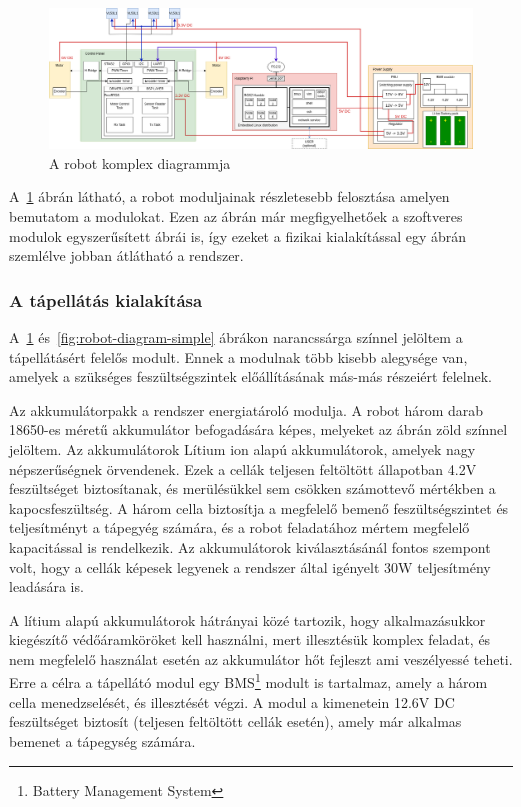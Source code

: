 \begin{figure}
  \centering
  \includegraphics[width=150mm, keepaspectratio]{figures/ch2/robot-diagram-complex.png}
  \caption{A robot komplex diagrammja}
  \label{fig:robot-diagram-complex}
\end{figure}

\medskip

A~\ref{fig:robot-diagram-complex} ábrán látható, a robot moduljainak részletesebb
felosztása amelyen bemutatom a modulokat. Ezen az ábrán már megfigyelhetőek a
szoftveres modulok egyszerűsített ábrái is, így ezeket a fizikai kialakítással
egy ábrán szemlélve jobban átlátható a rendszer.

\subsubsection{A tápellátás kialakítása}
A~\ref{fig:robot-diagram-complex} és~\ref{fig:robot-diagram-simple} ábrákon
narancssárga színnel jelöltem a tápellátásért felelős modult. Ennek a modulnak
több kisebb alegysége van, amelyek a szükséges feszültségszintek előállításának
más-más részeiért felelnek.

\medskip

Az akkumulátorpakk a rendszer energiatároló modulja. A robot három darab 18650-es
méretű akkumulátor befogadására képes, melyeket az ábrán zöld színnel
jelöltem. Az akkumulátorok Lítium ion alapú akkumulátorok, amelyek nagy
népszerűségnek örvendenek. Ezek a cellák teljesen feltöltött állapotban 4.2V
feszültséget biztosítanak, és merülésükkel sem csökken számottevő mértékben a
kapocsfeszültség. A három cella biztosítja a megfelelő bemenő feszültségszintet
és teljesítményt a tápegyég számára, és a robot feladatához mértem megfelelő
kapacitással is rendelkezik. Az akkumulátorok kiválasztásánál fontos szempont
volt, hogy a cellák képesek legyenek a rendszer által igényelt 30W teljesítmény
leadására is.

\medskip

A lítium alapú akkumulátorok hátrányai közé tartozik, hogy alkalmazásukkor
kiegészítő védőáramköröket kell használni, mert illesztésük komplex feladat, és
nem megfelelő használat esetén az akkumulátor hőt fejleszt ami veszélyessé
teheti. Erre a célra a tápellátó modul egy BMS\footnote{Battery Management
System} modult is tartalmaz, amely a három cella menedzselését, és illesztését
végzi. A modul a kimenetein 12.6V DC feszültséget biztosít (teljesen feltöltött
cellák esetén), amely már alkalmas bemenet a tápegység számára.


